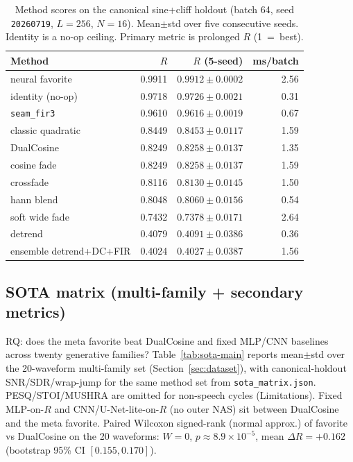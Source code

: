 \begin{table}[t]
  \centering
  \caption{Method scores on the canonical sine{+}cliff holdout (batch 64, seed \texttt{20260719}, $L{=}256$, $N{=}16$). Mean$\pm$std over five consecutive seeds. Identity is a no-op ceiling. Primary metric is prolonged $R$ (1~=~best).}
  \label{tab:canonical-methods}
  \setlength{\tabcolsep}{3pt}
  \begin{tabular}{@{}lrrr@{}}
    \toprule
    Method & $R$ & $R$ (5-seed) & ms/batch \\
    \midrule
    neural favorite & 0.9911 & $0.9912\pm0.0002$ & 2.56 \\
    identity (no-op) & 0.9718 & $0.9726\pm0.0021$ & 0.31 \\
    \texttt{seam\_fir3} & 0.9610 & $0.9616\pm0.0019$ & 0.67 \\
    classic quadratic & 0.8449 & $0.8453\pm0.0117$ & 1.59 \\
    DualCosine & 0.8249 & $0.8258\pm0.0137$ & 1.35 \\
    cosine fade & 0.8249 & $0.8258\pm0.0137$ & 1.59 \\
    crossfade & 0.8116 & $0.8130\pm0.0145$ & 1.50 \\
    hann blend & 0.8048 & $0.8060\pm0.0156$ & 0.54 \\
    soft wide fade & 0.7432 & $0.7378\pm0.0171$ & 2.64 \\
    detrend & 0.4079 & $0.4091\pm0.0386$ & 0.36 \\
    ensemble detrend{+}DC{+}FIR & 0.4024 & $0.4027\pm0.0387$ & 1.56 \\
    \bottomrule
  \end{tabular}
\end{table}

\subsection{SOTA matrix (multi-family + secondary metrics)}
\label{sec:sota-main}

RQ: does the meta favorite beat DualCosine and fixed MLP/CNN baselines across twenty generative families?
Table~\ref{tab:sota-main} reports mean$\pm$std over the 20-waveform multi-family set (Section~\ref{sec:dataset}), with canonical-holdout SNR/SDR/wrap-jump for the same method set from \texttt{sota\_matrix.json}.
PESQ/STOI/MUSHRA are omitted for non-speech cycles (Limitations).
Fixed MLP-on-$R$ and CNN/U-Net-lite-on-$R$ (no outer NAS) sit between DualCosine and the meta favorite.
Paired Wilcoxon signed-rank (normal approx.) of favorite vs DualCosine on the 20 waveforms: $W{=}0$, $p{\approx}8.9{\times}10^{-5}$, mean $\Delta R{=}{+}0.162$ (bootstrap 95\% CI $[0.155,0.170]$).

